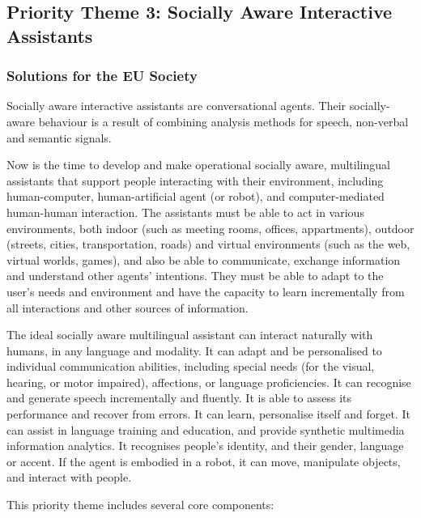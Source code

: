 \documentclass[10pt, plain]{../../metanetpaper}
\begin{document}
\begin{multicols}{2}
\subsection{Priority Theme 3: Socially Aware Interactive Assistants}
\label{sec:priority-theme-3-interactive-assistant}

\subsubsection{Solutions for the EU Society}
\label{sec:solutions-eu-society-pt3}

Socially aware interactive assistants are conversational agents. Their socially-aware behaviour is a result of combining analysis methods for speech, non-verbal and semantic signals.

Now is the time to develop and make operational socially aware, multilingual assistants that support people interacting with their environment, including human-computer, human-artificial agent (or robot), and computer-mediated human-human interaction. The assistants must be able to act in various environments, both indoor (such as meeting rooms, offices, appartments), outdoor (streets, cities, transportation, roads) and virtual environments (such as the web, virtual worlds, games), and also be able to communicate, exchange information and understand other agents' intentions. They must be able to adapt to the user's needs and environment and have the capacity to learn incrementally from all interactions and other sources of information.
 
The ideal socially aware multilingual assistant can interact naturally with humans, in any language and modality. It can adapt and be personalised to individual communication abilities, including special needs (for the visual, hearing, or motor impaired), affections, or language proficiencies. It can recognise and generate speech incrementally and fluently. It is able to assess its performance and recover from errors. It can learn, personalise itself and forget. It can assist in language training and education, and provide synthetic multimedia information analytics. It recognises people’s identity, and their gender, language or accent. If the agent is embodied in a robot, it can move, manipulate objects, and interact with people.

This priority theme includes several core components:


\end{multicols}
\end{document}
